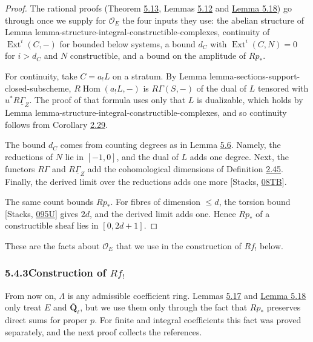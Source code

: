 \documentclass[11pt]{article}
\providecommand{\Ext}{}\renewcommand{\Ext}{\operatorname{Ext}}
\begin{document}
\begin{proof}[{Proof}]\label{bp478}%
The rational proofs (Theorem \hyperref[bp446]{5.13}, Lemmas \hyperref[bp443]{5.12} and \hyperref[bp467]{Lemma 5.18}) go through once we supply for \(\mathcal O_E\) the four inputs they use: the abelian structure of Lemma lemma-structure-integral-constructible-complexes, continuity of \(\Ext^i(C,-)\) for bounded below systems, a bound \(d_C\) with \(\Ext^i(C,N)=0\) for \(i>d_C\) and \(N\) constructible, and a bound on the amplitude of \(Rp_*\).

For continuity, take \(C=a_!L\) on a stratum. By Lemma lemma-sections-support-closed-subscheme, \(R\!\operatorname{Hom}(a_!L,-)\) is \(R\Gamma(S,-)\) of the dual of \(L\) tensored with \(u^*R\underline\Gamma_Z\). The proof of that formula uses only that \(L\) is dualizable, which holds by Lemma lemma-structure-integral-constructible-complexes, and so continuity follows from Corollary \hyperref[bp86]{2.29}.

The bound \(d_C\) comes from counting degrees as in Lemma \hyperref[bp426]{5.6}. Namely, the reductions of \(N\) lie in \([-1,0]\), and the dual of \(L\) adds one degree. Next, the functors \(R\Gamma\) and \(R\underline\Gamma_Z\) add the cohomological dimensions of Definition \hyperref[bp137]{2.45}. Finally, the derived limit over the reductions adds one more [Stacks, \href{https://stacks.math.columbia.edu/tag/08TB}{08TB}].

The same count bounds \(Rp_*\). For fibres of dimension \(\le d\), the torsion bound [Stacks, \href{https://stacks.math.columbia.edu/tag/095U}{095U}] gives \(2d\), and the derived limit adds one. Hence \(Rp_*\) of a constructible sheaf lies in \([0,2d+1]\).
\end{proof}

\label{bp479}%
These are the facts about \(\mathcal O_E\) that we use in the construction of \(Rf_!\) below.


\subsubsection*{\texorpdfstring{5.4.3\quad Construction of $Rf_!$}{5.4.3 Construction of Rf!}}
\label{bp480}%
\label{bp481}%
From now on, \(\Lambda\) is any admissible coefficient ring. Lemmas \hyperref[bp463]{5.17} and \hyperref[bp467]{Lemma 5.18} only treat \(E\) and \(\overline{\mathbf Q}_\ell\), but we use them only through the fact that \(Rp_*\) preserves direct sums for proper \(p\). For finite and integral coefficients this fact was proved separately, and the next proof collects the references.
\end{document}
